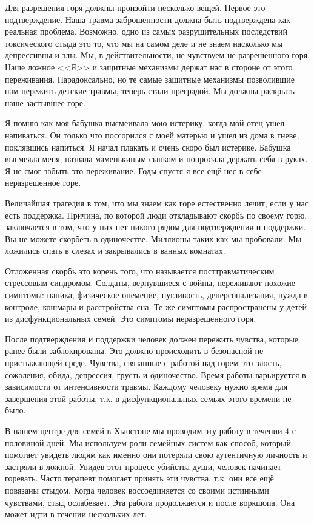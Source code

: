 \documentclass[10pt, fleqn]{article}
\begin{document}

Для разрешения горя должны произойти несколько вещей. Первое это подтверждение. Наша травма заброшенности должна быть подтверждена как реальная проблема. Возможно, одно из самых разрушительных последствий токсического стыда это то, что мы на самом деле и не знаем насколько мы депрессивны и злы. Мы, в действительности, не чувствуем не разрешенного горя. Наше ложное <<Я>> и защитные механизмы держат нас в стороне от этого переживания. Парадоксально, но те самые защитные механизмы позволившие нам пережить детские травмы, теперь стали преградой. Мы должны раскрыть наше застывшее горе.

Я помню как моя бабушка высмеивала мою истерику, когда мой отец ушел напиваться. Он только что поссорился с моей матерью и ушел из дома в гневе, поклявшись напиться. Я начал плакать и очень скоро был истерике. Бабушка высмеяла меня, назвала маменькиным сынком и попросила держать себя в руках. Я не смог забыть это переживание. Годы спустя я все ещё нес в себе неразрешенное горе.



Величайшая трагедия в том, что мы знаем как горе естественно лечит, если у нас есть поддержка.
Причина, по которой люди откладывают скорбь по своему горю, заключается в том, что у них нет никого рядом для подтверждения и поддержки. Вы не можете скорбеть в одиночестве. Миллионы таких как мы пробовали. Мы ложились спать в слезах и закрывались в ванных комнатах.

Отложенная скорбь это корень того, что называется посттравматическим стрессовым синдромом. Солдаты, вернувшиеся с войны, переживают похожие симптомы: паника, физическое онемение, пугливость, деперсонализация, нужда в контроле, кошмары и расстройства сна. Те же симптомы распространены у детей из дисфункциональных семей. Это симптомы неразрешенного горя.



После подтверждения и поддержки человек должен пережить чувства, которые ранее были заблокированы. Это должно происходить в безопасной не пристыжающей среде. Чувства, связанные с работой над горем это злость, сожаления, обида, депрессия, грусть и одиночество. Время работы варьируется в зависимости от интенсивности травмы. Каждому человеку нужно время для завершения этой работы, т.к. в дисфункциональных семьях этого времени не было.

В нашем центре для семей в Хьюстоне мы проводим эту работу в течении 4 с половиной дней. Мы используем роли семейных систем как способ, который помогает увидеть людям как именно они потеряли свою аутентичную личность и застряли в ложной. Увидев этот процесс убийства души, человек начинает горевать. Часто терапевт помогает принять эти чувства, т.к. они все ещё повязаны стыдом. Когда человек воссоединяется со своими истинными чувствами, стыд ослабевает. Эта работа продолжается и после воркшопа. Она может идти в течении нескольких лет.
\end{document}
